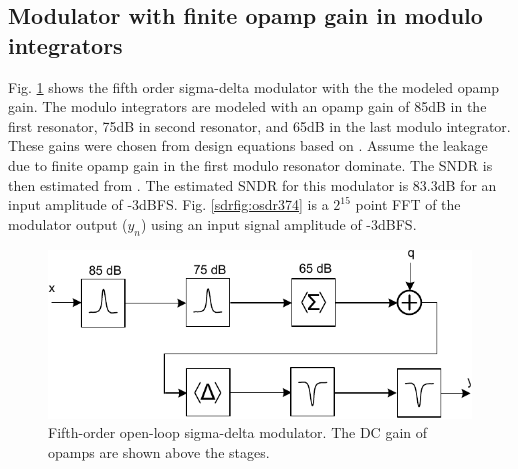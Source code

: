 \subsection{Modulator with finite opamp gain in modulo integrators}
Fig. \ref{sdrfig:osdr3g} shows the fifth order sigma-delta modulator with the
the modeled opamp gain. The modulo integrators are
modeled with an
opamp gain
of 85dB in the first resonator, 75dB in second resonator, and 65dB
in the last modulo
integrator. These gains were chosen from design equations based on .
Assume the leakage due to 
finite opamp gain in the first modulo resonator dominate. The SNDR is
then estimated from . The estimated SNDR for
this modulator is 83.3dB for an input amplitude of -3dBFS.
Fig.
\ref{sdrfig:osdr374} is a $2^{15}$ point FFT of the modulator output ($y_n$)
using an input signal amplitude of -3dBFS. 

\begin{figure}[htbp]
\centerline{ \includegraphics[width=\myfigwidth]{graphics/osdr21g_sch}}
  \caption{Fifth-order open-loop sigma-delta modulator. The DC gain of
    opamps are shown above the stages.}
  \label{sdrfig:osdr3g}
\end{figure}



